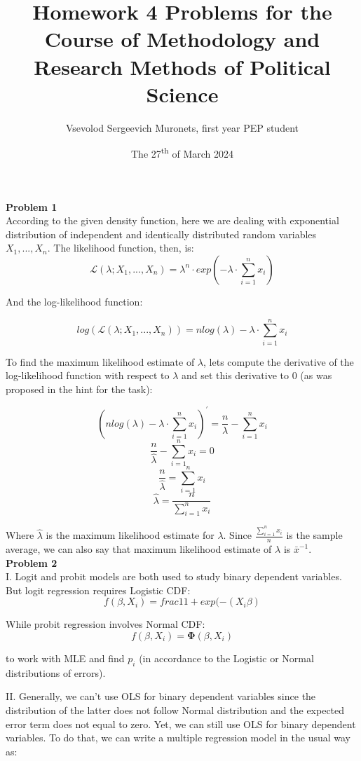 \documentclass{article}
\title{Homework 4 Problems for the Course of Methodology and Research Methods of Political Science}
\author{Vsevolod Sergeevich Muronets, first year PEP student}
\date{The 27\textsuperscript{th} of March 2024}
\begin{document}
\maketitle
\textbf{Problem 1}
\\

According to the given density function, here we are dealing with exponential distribution of independent and identically distributed random variables $X_1 , ..., X_n$. The likelihood function, then, is:
$$\mathcal{L}(\lambda; X_1, ..., X_n) = \lambda^n \cdot exp(-\lambda \cdot \sum_{i=1}^{n}x_i)$$

And the log-likelihood function:

$$log(\mathcal{L}(\lambda; X_1, ..., X_n)) = nlog(\lambda) - \lambda \cdot \sum_{i=1}^{n}x_i$$

To find the maximum likelihood estimate of $\lambda$, lets compute the derivative of the log-likelihood function with respect to $\lambda$ and set this derivative to 0 (as was proposed in the hint for the task):

$$(nlog(\lambda) - \lambda \cdot \sum_{i=1}^{n}x_i)^{\prime} = \frac{n}{\lambda} - \sum_{i=1}^{n}x_i$$
$$\frac{n}{\hat{\lambda}} - \sum_{i=1}^{n}x_i = 0$$
$$\frac{n}{\hat{\lambda}} = \sum_{i=1}^{n}x_i$$
$$\hat{\lambda} = \frac{n}{\sum_{i=1}^{n}x_i}$$

Where $\hat{\lambda}$ is the maximum likelihood estimate for $\lambda$. Since $\frac{\sum_{i=1}^{n}x_i}{n}$ is the sample average, we can also say that maximum likelihood estimate of $\lambda$ is $\bar{x}^{-1}$.
\\

\textbf{Problem 2}
\\

I. Logit and probit models are both used to study binary dependent variables. But logit regression requires Logistic CDF: 
$$f(\beta, X_i) = frac{1}{1 + exp(-(X_{i}\beta)}$$

While probit regression involves Normal CDF:
$$f(\beta, X_i) = \mathbf{\Phi}(\beta, X_{i})$$

to work with MLE and find $p_i$ (in accordance to the Logistic or Normal distributions of errors).

II. Generally, we can't use OLS for binary dependent variables since the distribution of the latter does not follow Normal distribution and the expected error term does not equal to zero. 
Yet, we can still use OLS for binary dependent variables. To do that, we can write a multiple regression model in the usual way as:
\end{document}
